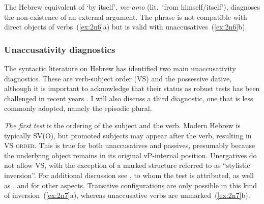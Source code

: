 \begin{exe}
\begin{xlist}
\begin{exe}
\begin{xlist}
\begin{exe}
\begin{xlist}
\begin{exe}
\begin{exe}
\begin{xlist}
		
 \z
\z 	

The Hebrew equivalent of `by itself', \emph{me-a{\ts}mo} (lit.~`from himself/itself'), diagnoses the non-existence of an external argument. The phrase is not compatible with direct objects of  verbs~(\ref{ex:2n6}a) but is valid with unaccusatives~(\ref{ex:2n6}b).
 \begin{exe}
 \ex  \label{ex:2n6}
 \begin{xlist} 
		
		
 \z
\z 


		\subsubsection{Unaccusativity diagnostics} \label{voice:tkal:nact:unacc}
The syntactic literature on Hebrew has identified two main unaccusativity diagnostics. These are verb-subject order (VS) and the possessive dative, although it is important to acknowledge that their status as robust tests has been challenged in recent years \citep{gafter14li,linzen14pd,kastner17gjgl}. I will also discuss a third diagnostic, one that is less commonly adopted, namely the episodic plural.

\textit{The first test} is the ordering of the subject and the verb. Modern Hebrew is typically SV(O), but promoted subjects may appear after the verb, resulting in \textsc{VS order}. This is true for both unaccusatives and passives, presumably because the underlying object remains in its original vP-internal position. Unergatives do not allow VS, with the exception of a marked structure referred to as ``stylistic inversion''. For additional discussion see \cite{shlonsky87}, to whom the test is attributed, as well as \cite{shlonskydoron91}, \cite{borer95} and \cite{preminger10} for other aspects. Transitive configurations are only possible in this kind of inversion~(\ref{ex:2n7}a), whereas unaccusative verbs are unmarked~(\ref{ex:2n7}b).


\end{xlist}
\end{exe}
\end{xlist}
\end{exe}
\end{exe}
\end{xlist}
\end{exe}
\end{xlist}
\end{exe}
\end{xlist}
\end{exe}
